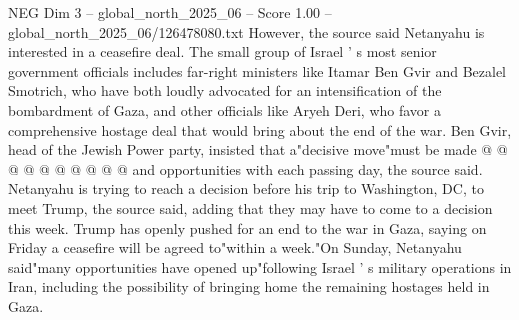 \begin{textsample}{NEG Dim 3 – global\_north\_2025\_06 – Score 1.00 – global\_north\_2025\_06/126478080.txt}
However, the source said Netanyahu is interested in a ceasefire deal.
The small group of Israel ' s most senior government officials includes far-right ministers like Itamar Ben Gvir and Bezalel Smotrich, who have both loudly advocated for an intensification of the bombardment of Gaza, and other officials like Aryeh Deri, who favor a comprehensive hostage deal that would bring about the end of the war.
Ben Gvir, head of the Jewish Power party, insisted that a"decisive move"must be made @ @ @ @ @ @ @ @ @ @ and opportunities with each passing day, the source said.
Netanyahu is trying to reach a decision before his trip to Washington, DC, to meet Trump, the source said, adding that they may have to come to a decision this week.
Trump has openly pushed for an end to the war in Gaza, saying on Friday a ceasefire will be agreed to"within a week."On Sunday, Netanyahu said"many opportunities have opened up"following Israel ' s military operations in Iran, including the possibility of bringing home the remaining hostages held in Gaza.

\end{textsample}

